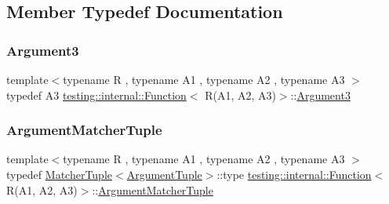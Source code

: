 \subsection{Member Typedef Documentation}
\mbox{\label{structtesting_1_1internal_1_1_function_3_01_r_07_a1_00_01_a2_00_01_a3_08_4_a2ac6eefb33feafe85c1c6742bdab509f}} 
\subsubsection{\texorpdfstring{Argument3}{Argument3}}
{\footnotesize\ttfamily template$<$typename R , typename A1 , typename A2 , typename A3 $>$ \\
typedef A3 \hyperlink{structtesting_1_1internal_1_1_function}{testing\+::internal\+::\+Function}$<$ R(A1, A2, A3)$>$\+::\hyperlink{structtesting_1_1internal_1_1_function_3_01_r_07_a1_00_01_a2_00_01_a3_08_4_a2ac6eefb33feafe85c1c6742bdab509f}{Argument3}}

\mbox{\label{structtesting_1_1internal_1_1_function_3_01_r_07_a1_00_01_a2_00_01_a3_08_4_acb08fa0fffe1213ce88f53343bb3b564}} 
\subsubsection{\texorpdfstring{Argument\+Matcher\+Tuple}{ArgumentMatcherTuple}}
{\footnotesize\ttfamily template$<$typename R , typename A1 , typename A2 , typename A3 $>$ \\
typedef \hyperlink{structtesting_1_1internal_1_1_matcher_tuple}{Matcher\+Tuple}$<$\hyperlink{structtesting_1_1internal_1_1_function_3_01_r_07_08_4_ad483c3128c470d8cdb55c3ac1c575c11}{Argument\+Tuple}$>$\+::type \hyperlink{structtesting_1_1internal_1_1_function}{testing\+::internal\+::\+Function}$<$ R(A1, A2, A3)$>$\+::\hyperlink{structtesting_1_1internal_1_1_function_3_01_r_07_08_4_a9bec5cf8937e8af99dedab2f40129fab}{Argument\+Matcher\+Tuple}}

